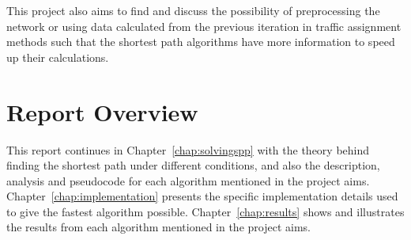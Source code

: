 This project also aims to find and discuss the possibility of preprocessing the network or using data calculated from the previous iteration in traffic assignment methods such that the shortest path algorithms have more information to speed up their calculations.

\section{Report Overview}
This report continues in Chapter~\ref{chap:solvingspp} with the theory behind finding the shortest path under different conditions,
and also the description, analysis and pseudocode for each algorithm mentioned in the project aims.
Chapter~\ref{chap:implementation} presents the specific implementation details used to give the fastest algorithm possible.
Chapter~\ref{chap:results} shows and illustrates the results from each algorithm mentioned in the project aims.



